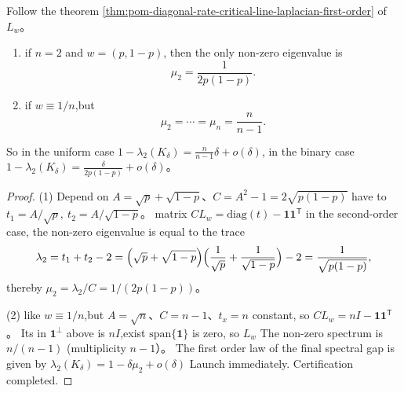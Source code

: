 \begin{corollary}\label{cor:pom-diagonal-rate-critical-spectrum-binary-uniform}
Follow the theorem \ref{thm:pom-diagonal-rate-critical-line-laplacian-first-order} of \(L_w\)。
\begin{enumerate}
  \item if \(n=2\) and \(w=(p,1-p)\), then the only non-zero eigenvalue is
  \[
  \mu_2=\frac{1}{2p(1-p)}.
  \]
  \item if \(w\equiv 1/n\),but
  \[
  \mu_2=\cdots=\mu_n=\frac{n}{n-1}.
  \]
\end{enumerate}
So in the uniform case \(1-\lambda_2(K_\delta)=\frac{n}{n-1}\delta+o(\delta)\), in the binary case \(1-\lambda_2(K_\delta)=\frac{\delta}{2p(1-p)}+o(\delta)\)。
\end{corollary}
\begin{proof}
\textup{(1)} Depend on \(A=\sqrt p+\sqrt{1-p}\)、\(C=A^2-1=2\sqrt{p(1-p)}\) have to
\(
t_1=A/\sqrt p,\ t_2=A/\sqrt{1-p}
\)。
matrix \(CL_w=\mathrm{diag}(t)-\mathbf 1\mathbf 1^{\mathsf T}\) in the second-order case, the non-zero eigenvalue is equal to the trace
\[
\lambda_2=t_1+t_2-2
=\Bigl(\sqrt p+\sqrt{1-p}\Bigr)\Bigl(\frac{1}{\sqrt p}+\frac{1}{\sqrt{1-p}}\Bigr)-2
=\frac{1}{\sqrt{p(1-p)}},
\]
thereby \(\mu_2=\lambda_2/C=1/(2p(1-p))\)。
\par
\textup{(2)} like \(w\equiv 1/n\),but \(A=\sqrt n\)、\(C=n-1\)、\(t_x=n\) constant, so \(CL_w=nI-\mathbf 1\mathbf 1^{\mathsf T}\)。
Its in \(\mathbf 1^\perp\) above is \(nI\),exist \(\mathrm{span}\{\mathbf 1\}\) is zero, so \(L_w\) The non-zero spectrum is \(n/(n-1)\) (multiplicity \(n-1\)）。
The first order law of the final spectral gap is given by
\(
\lambda_2(K_\delta)=1-\delta\mu_2+o(\delta)
\)
Launch immediately. Certification completed.
\end{proof}

